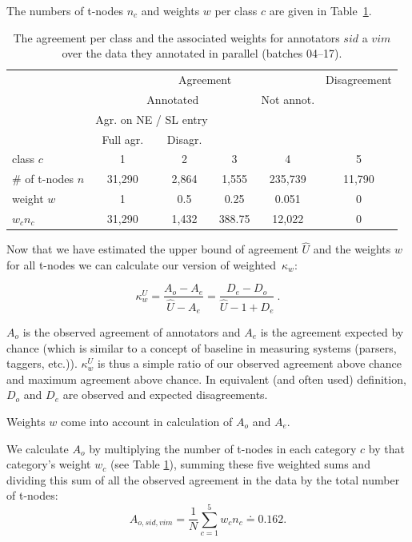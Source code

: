 The numbers of t-nodes $n_c$ and weights $w$ per class $c$ are given in Table~\ref{tab-agreement}.

\begin{table}[H]
\begin{center}
 \begin{tabular}{l|c|c|c|c|c}

&\multicolumn{4}{c|}{Agreement} & Disagreement\\
\cline{2-6}
&\multicolumn{3}{c|}{Annotated} & Not annot. &  \\
\cline{2-5}
&\multicolumn{2}{c|}{Agr. on NE / SL entry} &&&\\
\cline{2-3}
&Full agr. & Disagr. &&&\\
\cline{1-6}
class $c$& 1 & 2 & 3 & 4 & 5\\
\cline{1-6}
\# of t-nodes $n$& 31,290 & 2,864 & 1,555 & 235,739 & 11,790\\
\cline{1-6}
weight $w$ & 1 & 0.5 & 0.25 & 0.051 & 0 \\
\cline{1-6}
$w_c n_c$ & 31,290 & 1,432 & 388.75 & 12,022 & 0\\
\end{tabular}
\end{center}
\caption{The agreement per class and the associated weights for annotators $sid$ a $vim$ over the data they annotated in parallel (batches 04--17).}
\label{tab-agreement}
\end{table}


Now that we have estimated the upper bound of agreement $\widehat{U}$ and the weights $w$ for all t-nodes we can calculate our version of weighted~$\kappa_w$:

\begin{equation}
\label{ourkappa}
\kappa_w^U = \frac{A_o - A_e}{\widehat{U} - A_e} =
             \frac{D_e - D_o}{\widehat{U} - 1 + D_e}\ .
\end{equation}

$A_o$ is the observed agreement of annotators and $A_e$ is the agreement expected by chance (which is similar to a concept of baseline in measuring systems (parsers, taggers, etc.)). $\kappa_w^U$ is thus a simple ratio of our observed agreement above chance and maximum agreement above chance. In equivalent (and often used) definition, $D_o$ and $D_e$ are observed and expected disagreements.

Weights $w$ come into account in calculation of $A_o$ and $A_e$.

We calculate $A_o$ by multiplying the number of t-nodes in each category $c$ by that category's weight $w_c$ (see Table \ref{tab-agreement}), summing these five weighted sums and dividing this sum of all the observed agreement in the data by the total number of t-nodes:
\[	A_{o, sid, vim} = \frac{1}{N} \sum_{c =1}^{5} w_c n_c \doteq 0.162.
	\]

